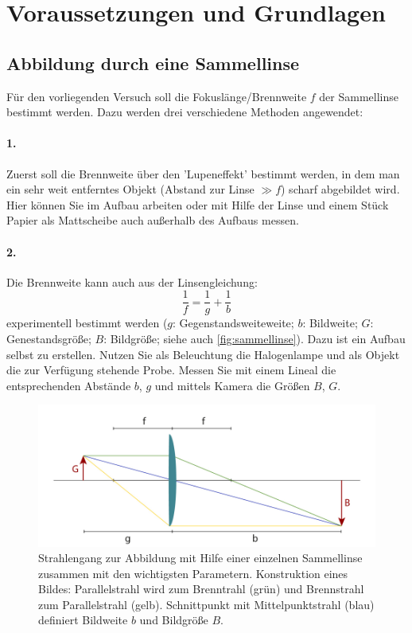 \documentclass[ngerman]{scrartcl}
\begin{document}
\section[Voraussetzungen und Grundlagen]{Voraussetzungen und Grundlagen \cite{ref:angabe}}
\label{sec:voraussetzungen_grundlagen}

\subsection{Abbildung durch eine Sammellinse}
\label{subsec:abbildung_sammellinse_Grundlagen}
Für den vorliegenden Versuch soll die Fokuslänge/Brennweite $f$ der Sammellinse bestimmt werden. Dazu werden drei verschiedene Methoden angewendet: 
\paragraph{1.} Zuerst soll die Brennweite über den 'Lupeneffekt' bestimmt werden, in dem man ein sehr weit entferntes Objekt (Abstand zur Linse $\gg  f$) scharf abgebildet wird. Hier können Sie im Aufbau arbeiten oder mit Hilfe der Linse und einem Stück Papier als Mattscheibe auch außerhalb des Aufbaus messen. 

\paragraph{2.} Die Brennweite kann auch aus der Linsengleichung: 
\begin{equation}
    \label{eq:linsengleichung}
    \frac{1}{f} = \frac{1}{g} + \frac{1}{b}
\end{equation}
experimentell bestimmt werden ($g$: Gegenstandsweiteweite; $b$: Bildweite; $G$: Genestandsgröße; $B$: Bildgröße; siehe auch \autoref{fig:sammellinse}). Dazu ist ein Aufbau selbst zu erstellen. Nutzen Sie als Beleuchtung die Halogenlampe und als Objekt die zur Verfügung
stehende Probe. Messen Sie mit einem Lineal die entsprechenden Abstände $b$, $g$ und
mittels Kamera die Größen $B$, $G$.
\begin{figure}[H]
    \centering
    \begin{samepage}
        \includegraphics[width=\linewidth]{fig/Sammellinse.png}
        \caption[Strahlengang einer Sammellinse]{Strahlengang zur Abbildung mit Hilfe einer einzelnen Sammellinse zusammen mit den wichtigsten Parametern. Konstruktion eines Bildes: Parallelstrahl wird zum Brenntrahl (grün) und Brennstrahl zum Parallelstrahl (gelb). Schnittpunkt mit Mittelpunktstrahl (blau) definiert Bildweite $b$ und Bildgröße $B$.}
        \label{fig:sammellinse}
    \end{samepage}
\end{figure}
\end{document}
